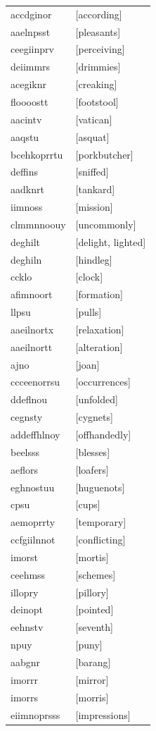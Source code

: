 \documentclass{article}
\begin{document}
\begin{tabular}{ll}
accdginor & [according] \\
aaelnpsst & [pleasants] \\
ceegiinprv & [perceiving] \\
deiimmrs & [drimmies] \\
acegiknr & [creaking] \\
floooostt & [footstool] \\
aacintv & [vatican] \\
aaqstu & [asquat] \\
bcehkoprrtu & [porkbutcher] \\
deffins & [sniffed] \\
aadknrt & [tankard] \\
iimnoss & [mission] \\
clmmnnoouy & [uncommonly] \\
deghilt & [delight, lighted] \\
deghiln & [hindleg] \\
ccklo & [clock] \\
afimnoort & [formation] \\
llpsu & [pulls] \\
aaeilnortx & [relaxation] \\
aaeilnortt & [alteration] \\
ajno & [joan] \\
ccceenorrsu & [occurrences] \\
ddeflnou & [unfolded] \\
cegnsty & [cygnets] \\
addeffhlnoy & [offhandedly] \\
beelsss & [blesses] \\
aeflors & [loafers] \\
eghnostuu & [huguenots] \\
cpsu & [cups] \\
aemoprrty & [temporary] \\
ccfgiilnnot & [conflicting] \\
imorst & [mortis] \\
ceehmss & [schemes] \\
illopry & [pillory] \\
deinopt & [pointed] \\
eehnstv & [seventh] \\
npuy & [puny] \\
aabgnr & [barang] \\
imorrr & [mirror] \\
imorrs & [morris] \\
eiimnoprsss & [impressions] \\

\end{tabular}
\end{document}
